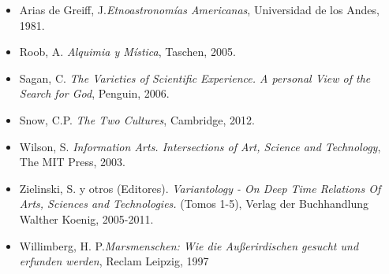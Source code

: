 \documentclass{report}
\begin{document}
\begin{itemize}
\item Arias de Greiff, J.\emph{Etnoastronom\'ias Americanas}, Universidad de los Andes, 1981.
\item Roob, A. \emph{Alquimia y M\'istica}, Taschen, 2005.
\item Sagan, C. \emph{The Varieties of Scientific Experience. A personal View of the Search for God}, Penguin, 2006.
\item Snow, C.P. \emph{The Two Cultures}, Cambridge, 2012.
\item Wilson, S. \emph{Information Arts. Intersections of Art, Science
and Technology}, The MIT Press, 2003.
\item Zielinski, S. y otros (Editores). \emph{Variantology - On Deep Time
  Relations Of Arts, Sciences and Technologies.} (Tomos 1-5), Verlag
der Buchhandlung Walther Koenig, 2005-2011.

\item Willimberg, H. P.\emph{Marsmenschen:  Wie die Au\ss erirdischen
  gesucht und erfunden werden}, Reclam Leipzig, 1997

\end{itemize}
\end{document}
